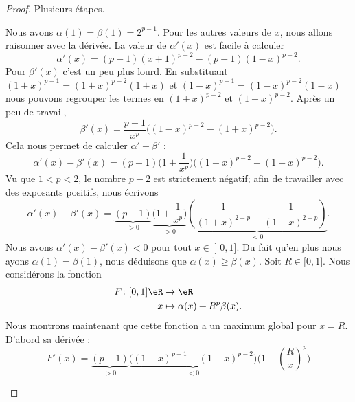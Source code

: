 	\begin{proof}
		Plusieurs étapes.
		\begin{subproof}
			Nous avons \( \alpha(1)=\beta(1)=2^{p-1}\). Pour les autres valeurs de \( x\), nous allons raisonner avec la dérivée. La valeur de \( \alpha'(x)\) est facile à calculer
			\begin{equation}
				\alpha'(x)=(p-1)(x+1)^{p-2}-(p-1)(1-x)^{p-2}.
			\end{equation}
			Pour \( \beta'(x)\) c'est un peu plus lourd. En substituant \( (1+x)^{p-1}=(1+x)^{p-2}(1+x)\) et \( (1-x)^{p-1}=(1-x)^{p-2}(1-x)\) nous pouvons regrouper les termes en \( (1+x)^{p-2}\) et \( (1-x)^{p-2}\). Après un peu de travail,
			\begin{equation}
				\beta'(x)=\frac{ p-1 }{ x^p }\big( (1-x)^{p-2}-(1+x)^{p-2} \big).
			\end{equation}
			Cela nous permet de calculer \( \alpha'-\beta'\) :
			\begin{equation}
				\alpha'(x)-\beta'(x)=(p-1)\big( 1+\frac{1}{ x^p } \big)\big( (1+x)^{p-2}-(1-x)^{p-2} \big).
			\end{equation}
			Vu que \( 1<p<2\), le nombre \( p-2\) est strictement négatif; afin de travailler avec des exposants positifs, nous écrivons
			\begin{equation}
				\alpha'(x)-\beta'(x)=\underbrace{(p-1)}_{>0}\underbrace{\big( 1+\frac{1}{ x^p } \big)}_{>0}\underbrace{\left( \frac{1}{ (1+x)^{2-p}}-\frac{1}{ (1-x)^{2-p} }  \right)}_{<0}.
			\end{equation}
			Nous avons \( \alpha'(x)-\beta'(x)<0\) pour tout \( x\in \mathopen] 0 , 1 \mathclose]\). Du fait qu'en plus nous ayons \( \alpha(1)=\beta(1)\), nous déduisons que \( \alpha(x)\geq \beta(x)\).
			Soit \( R\in \mathopen[ 0 , 1 \mathclose]\). Nous considérons la fonction
			\begin{equation}
				\begin{aligned}
					F\colon \mathopen[ 0 , 1 \mathclose]\eR & \to \eR                        \\
					x                                       & \mapsto \alpha(x)+R^p\beta(x).
				\end{aligned}
			\end{equation}
			Nous montrons maintenant que cette fonction a un maximum global pour \( x=R\). D'abord sa dérivée :
			\begin{equation}
				F'(x)=\underbrace{(p-1)}_{>0}\underbrace{\Big( (1-x)^{p-1}-(1+x)^{p-2} \Big)}_{<0}\Big( 1-\left( \frac{ R }{ x } \right)^p \Big)

\end{equation}
\end{subproof}
\end{proof}
